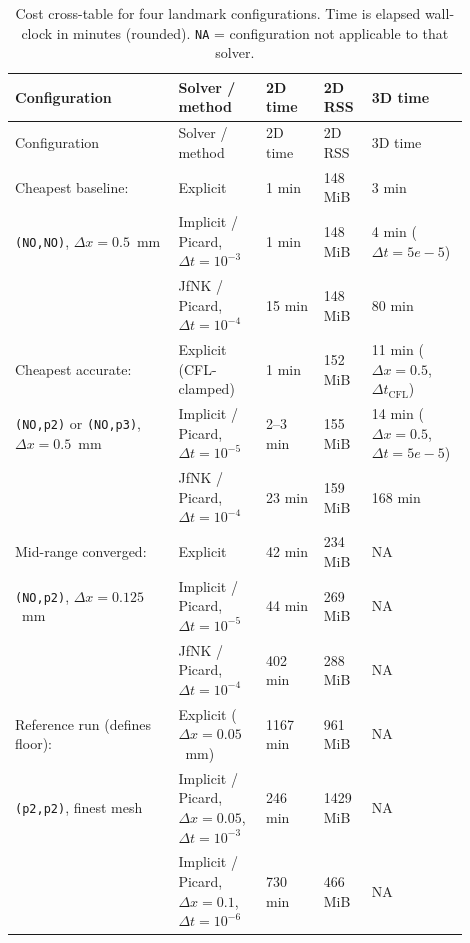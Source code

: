 \documentclass[11pt,a4paper]{article}
\newcommand{\code}[1]{\texttt{\small #1}}
\begin{document}
\begin{center}\footnotesize
\begin{longtable}{p{0.34\linewidth}p{0.18\linewidth}p{0.12\linewidth}p{0.10\linewidth}p{0.16\linewidth}}
\caption{Cost cross-table for four landmark configurations. Time is
elapsed wall-clock in minutes (rounded). \code{NA} = configuration
not applicable to that solver.}\\
\toprule
Configuration & Solver / method & 2D time & 2D RSS & 3D time \\
\midrule\endfirsthead\toprule
Configuration & Solver / method & 2D time & 2D RSS & 3D time \\
\midrule\endhead
Cheapest baseline:           & Explicit                 & 1 min        & 148 MiB  & 3 min                   \\
\code{(NO,NO)}, $\Delta x = 0.5$~mm
                             & Implicit / Picard, $\Delta t = 10^{-3}$ & 1 min        & 148 MiB  & 4 min ($\Delta t = 5e\!-\!5$)  \\
                             & JfNK / Picard, $\Delta t = 10^{-4}$     & 15 min       & 148 MiB  & 80 min                 \\
\midrule
Cheapest accurate:           & Explicit (CFL-clamped)   & 1 min        & 152 MiB  & 11 min ($\Delta x = 0.5$, $\Delta t_{\text{CFL}}$) \\
\code{(NO,p2)} or \code{(NO,p3)}, $\Delta x = 0.5$~mm
                             & Implicit / Picard, $\Delta t = 10^{-5}$ & 2--3 min     & 155 MiB  & 14 min ($\Delta x = 0.5$, $\Delta t = 5e\!-\!5$)             \\
                             & JfNK / Picard, $\Delta t = 10^{-4}$     & 23 min       & 159 MiB  & 168 min                \\
\midrule
Mid-range converged:         & Explicit                 & 42 min       & 234 MiB  & NA                     \\
\code{(NO,p2)}, $\Delta x = 0.125$~mm
                             & Implicit / Picard, $\Delta t = 10^{-5}$ & 44 min       & 269 MiB  & NA                     \\
                             & JfNK / Picard, $\Delta t = 10^{-4}$     & 402 min      & 288 MiB  & NA                     \\
\midrule
Reference run (defines floor): & Explicit ($\Delta x = 0.05$~mm) & 1167 min  & 961 MiB  & NA \\
\code{(p2,p2)}, finest mesh
                             & Implicit / Picard, $\Delta x = 0.05$, $\Delta t = 10^{-3}$ & 246 min & 1429 MiB & NA \\
                             & Implicit / Picard, $\Delta x = 0.1$, $\Delta t = 10^{-6}$  & 730 min & 466 MiB  & NA \\
\bottomrule
\end{longtable}\end{center}
\end{document}
